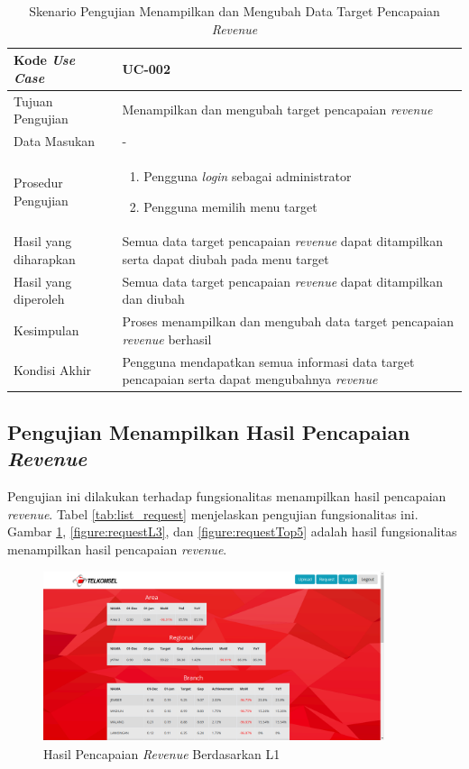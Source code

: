 \begin{table}[h!]
	\centering
	\begin{tabular}{|p{4cm}|p{6cm}|}
	\hline
	Kode \textit{Use Case} & UC-002\\ \hline
	Tujuan Pengujian & Menampilkan dan mengubah target pencapaian \textit{revenue}\\ \hline
	Data Masukan & - \\ \hline
	Prosedur Pengujian & 
		\begin{enumerate}
		\item Pengguna \textit{login} sebagai administrator
		\item Pengguna memilih menu target
		\end{enumerate}\\ \hline
	Hasil yang diharapkan & Semua data target pencapaian \textit{revenue} dapat ditampilkan serta dapat diubah pada menu target \\ \hline
	Hasil yang diperoleh & Semua data target pencapaian \textit{revenue} dapat ditampilkan dan diubah \\ \hline
	Kesimpulan & Proses menampilkan dan mengubah data target pencapaian \textit{revenue} berhasil\\ \hline
	Kondisi Akhir & Pengguna mendapatkan semua informasi data target pencapaian serta dapat mengubahnya \textit{revenue}\\ \hline
	\end{tabular}\caption{Skenario Pengujian Menampilkan dan Mengubah Data Target Pencapaian \textit{Revenue}}
	\label{tab:list_target}
\end{table}

\subsection{Pengujian Menampilkan Hasil Pencapaian \textit{Revenue}}
Pengujian ini dilakukan terhadap fungsionalitas menampilkan hasil pencapaian \textit{revenue}. Tabel \ref{tab:list_request} menjelaskan pengujian fungsionalitas ini. Gambar \ref{figure:requestL1}, \ref{figure:requestL3}, dan \ref{figure:requestTop5} adalah hasil fungsionalitas menampilkan hasil pencapaian \textit{revenue}.

\begin{figure}[h!]
	\centerline
	{\includegraphics[width=10cm,height=5cm]{bab6/halamanL1.png}}
	\caption{Hasil Pencapaian \textit{Revenue} Berdasarkan L1}
	\label{figure:requestL1}
\end{figure}

